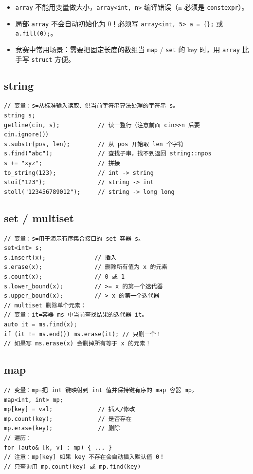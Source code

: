 \documentclass[UTF8,openany,oneside,zihao=-4]{ctexbook}
\begin{document}
\begin{warn}
\begin{itemize}
  \item \lstinline|array| 不能用变量做大小，\lstinline|array<int, n>| 编译错误（n 必须是 \lstinline|constexpr|）。
  \item 局部 \lstinline|array| 不会自动初始化为 0！必须写 \lstinline|array<int, 5> a = {};| 或 \lstinline|a.fill(0);|。
  \item 竞赛中常用场景：需要把固定长度的数组当 \lstinline|map| / \lstinline|set| 的 key 时，用 \lstinline|array| 比手写 \lstinline|struct| 方便。
\end{itemize}
\end{warn}

\subsection{string}
\begin{lstlisting}
// 变量：s=从标准输入读取、供当前字符串算法处理的字符串 s。
string s;
getline(cin, s);           // 读一整行（注意前面 cin>>n 后要 cin.ignore()）
s.substr(pos, len);        // 从 pos 开始取 len 个字符
s.find("abc");             // 查找子串，找不到返回 string::npos
s += "xyz";                // 拼接
to_string(123);            // int -> string
stoi("123");               // string -> int
stoll("123456789012");     // string -> long long
\end{lstlisting}

\subsection{set / multiset}
\begin{lstlisting}
// 变量：s=用于演示有序集合接口的 set 容器 s。
set<int> s;
s.insert(x);              // 插入
s.erase(x);               // 删除所有值为 x 的元素
s.count(x);               // 0 或 1
s.lower_bound(x);         // >= x 的第一个迭代器
s.upper_bound(x);         // > x 的第一个迭代器
// multiset 删除单个元素：
// 变量：it=容器 ms 中当前查找结果的迭代器 it。
auto it = ms.find(x);
if (it != ms.end()) ms.erase(it); // 只删一个！
// 如果写 ms.erase(x) 会删掉所有等于 x 的元素！
\end{lstlisting}

\subsection{map}
\begin{lstlisting}
// 变量：mp=把 int 键映射到 int 值并保持键有序的 map 容器 mp。
map<int, int> mp;
mp[key] = val;             // 插入/修改
mp.count(key);             // 是否存在
mp.erase(key);             // 删除
// 遍历：
for (auto& [k, v] : mp) { ... }
// 注意：mp[key] 如果 key 不存在会自动插入默认值 0！
// 只查询用 mp.count(key) 或 mp.find(key)
\end{lstlisting}
\end{document}
